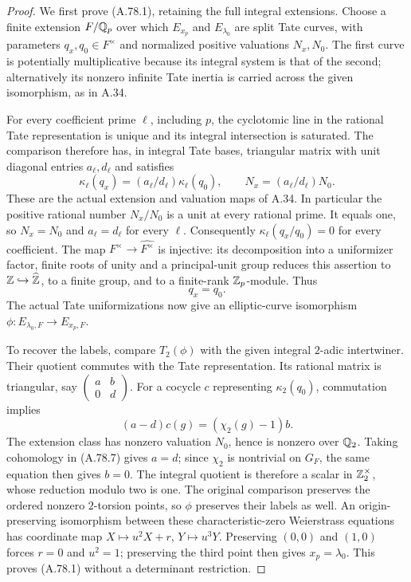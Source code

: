\begin{proof}
We first prove (A.78.1), retaining the full integral extensions.
Choose a finite extension $F/\mathbb Q_p$ over which $E_{x_p}$ and
$E_{\lambda_0}$ are split Tate curves, with parameters
$q_x,q_0\in F^\times$ and normalized positive valuations
$N_x,N_0$.  The first curve is potentially multiplicative
because its integral system is that of the second; alternatively
its nonzero infinite Tate inertia is carried across the given
isomorphism, as in A.34.

For every coefficient prime $\ell$, including $p$, the
cyclotomic line in the rational Tate representation is unique
and its integral intersection is saturated.  The comparison
therefore has, in integral Tate bases, triangular matrix with
unit diagonal entries $a_\ell,d_\ell$ and satisfies
\[
 \kappa_\ell(q_x)=(a_\ell/d_\ell)\kappa_\ell(q_0),
 \qquad
                 N_x=(a_\ell/d_\ell)N_0.
\tag{A.78.5}
\]
These are the actual extension and valuation maps of A.34.
In particular the positive rational number $N_x/N_0$ is a
unit at every rational prime.  It equals one, so
$N_x=N_0$ and $a_\ell=d_\ell$ for every $\ell$.
Consequently $\kappa_\ell(q_x/q_0)=0$ for every coefficient.
The map $F^\times\to\widehat{F^\times}$ is injective:
its decomposition into a uniformizer factor, finite roots of
unity and a principal-unit group reduces this assertion to
$\mathbb Z\hookrightarrow\widehat{\mathbb Z}$, to a finite group, and to a
finite-rank $\mathbb Z_p$-module.  Thus
\[
                                  q_x=q_0.
\tag{A.78.6}
\]
The actual Tate uniformizations now give an elliptic-curve
isomorphism $\phi:E_{\lambda_0,F}\to E_{x_p,F}$.

To recover the labels, compare $T_2(\phi)$ with the given
integral $2$-adic intertwiner.  Their quotient commutes with
the Tate representation.  Its rational matrix is triangular,
say $\left(\begin{smallmatrix}a&b\\0&d\end{smallmatrix}\right)$.
For a cocycle $c$ representing $\kappa_2(q_0)$, commutation
implies
\[
                    (a-d)c(g)=(\chi_2(g)-1)b.
\tag{A.78.7}
\]
The extension class has nonzero valuation $N_0$, hence is
nonzero over $\mathbb Q_2$.  Taking cohomology in (A.78.7) gives
$a=d$; since $\chi_2$ is nontrivial on $G_F$, the same
equation then gives $b=0$.
The integral quotient is therefore a scalar in $\mathbb Z_2^\times$,
whose reduction modulo two is one.
The original comparison preserves the ordered nonzero
$2$-torsion points, so $\phi$ preserves their labels as well.
An origin-preserving isomorphism between these characteristic-zero
Weierstrass equations has coordinate map
$X\mapsto u^2X+r$, $Y\mapsto u^3Y$.
Preserving $(0,0)$ and $(1,0)$ forces $r=0$ and $u^2=1$;
preserving the third point then gives $x_p=\lambda_0$.
This proves (A.78.1) without a determinant restriction.


\end{proof}
